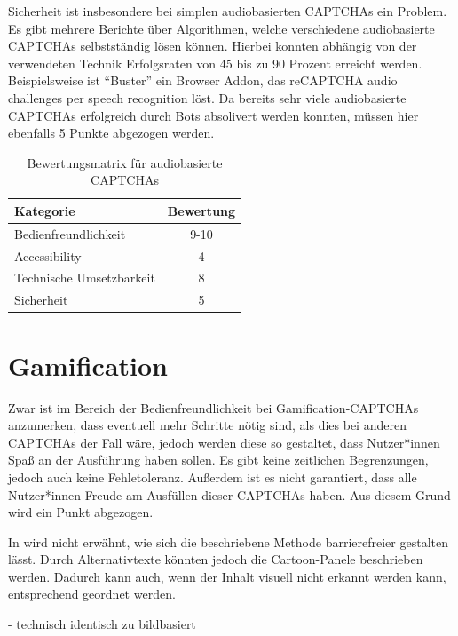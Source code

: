 Sicherheit ist insbesondere bei simplen audiobasierten CAPTCHAs ein Problem.
Es gibt mehrere Berichte über Algorithmen, welche verschiedene audiobasierte CAPTCHAs selbstständig lösen können.
Hierbei konnten abhängig von der verwendeten Technik Erfolgsraten von 45 bis zu 90 Prozent erreicht werden.
Beispielsweise ist “Buster” ein Browser Addon, das reCAPTCHA audio challenges per speech recognition löst.
Da bereits sehr viele audiobasierte CAPTCHAs erfolgreich durch Bots absolivert werden konnten,
müssen hier ebenfalls 5 Punkte abgezogen werden.

\begin{table}[h!]
    \caption{Bewertungsmatrix für audiobasierte CAPTCHAs}
    \begin{center}
        \begin{tabular}{l|c}
            Kategorie                       & Bewertung \\\hline
            Bedienfreundlichkeit            & 9-10         \\
            Accessibility                   & 4        \\
            Technische Umsetzbarkeit        & 8         \\
            Sicherheit                      & 5         
        \end{tabular}
    \end{center}
\end{table}

\section{Gamification}
Zwar ist im Bereich der Bedienfreundlichkeit bei Gamification-CAPTCHAs anzumerken, 
dass eventuell mehr Schritte nötig sind, als dies bei anderen CAPTCHAs der Fall wäre,
jedoch werden diese so gestaltet, dass Nutzer*innen Spaß an der Ausführung haben sollen. 
Es gibt keine zeitlichen Begrenzungen, jedoch auch keine Fehletoleranz.
Außerdem ist es nicht garantiert, dass alle Nutzer*innen Freude am Ausfüllen dieser CAPTCHAs haben.
Aus diesem Grund wird ein Punkt abgezogen.

In \cite{gamified} wird nicht erwähnt, wie sich die beschriebene Methode barrierefreier gestalten lässt.
Durch Alternativtexte könnten jedoch die Cartoon-Panele beschrieben werden.
Dadurch kann auch, wenn der Inhalt visuell nicht erkannt werden kann, entsprechend geordnet werden.

- technisch identisch zu bildbasiert


